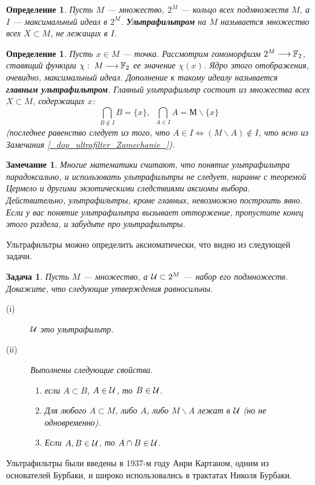 \documentclass[12pt]{book}
\newcommand{\arrow}{{\:\longrightarrow\:}}
\theoremstyle{upshape}
\newtheorem{zadacha}{Задача}[chapter]
\theoremstyle{generic}
\newtheorem{opredelenie}[teorema]{Определение}
\newtheorem{remark}[teorema]{Замечание}
\def\замечание{\begin{remark}}
\def\еза{\end{remark}}
\theoremstyle{upshapenonumber}
\renewcommand{\labelenumi}{\ralph{enumi}.}
\newcommand{\следствие}{%
     \refstepcounter{teorema}
     {\noindent\bf Следствие \thechapter.\arabic{teorema}:\ }}
\newcommand{\пример}{%
     \refstepcounter{teorema}
     {\noindent\bf Пример \thechapter.\arabic{teorema}:\ }}
\newcommand{\лемма}{%
     \refstepcounter{teorema}
     {\noindent\bf Лемма \thechapter.\arabic{teorema}:\ }}
\newcommand{\теорема}{%
     \refstepcounter{teorema}
     {\noindent\bf Теорема \thechapter.\arabic{teorema}:\ }}
\newcommand{\утверждение}{%
     \refstepcounter{teorema}
     {\noindent\bf Утверждение \thechapter.\arabic{teorema}:\ }}
\def\бф{\bf}
\def\ем{\em}
\def\задача{\begin{zadacha}}
\def\ез{\end{zadacha}}
\def\еу{\end{ukazanie}}
\def\определение{\begin{opredelenie}}
\def\ео{\end{opredelenie}}
\def\енум{\begin{enumerate}}
\def\ее{\end{enumerate}}
\begin{document}
\определение
Пусть $M$ --- множество, $2^M$ --- кольцо всех подмножеств $M$,
а $I$ --- максимальный идеал в $2^M$. {\бф Ультрафильтром} на $M$
называется множество всех $X\subset M$, не лежащих в $I$.
\ео





\определение
Пусть $x\in M$ --- точка. Рассмотрим гомоморфизм 
$2^M \arrow {\Bbb F}_2$, ставящий функции $\chi:\; M \arrow {\Bbb F}_2$
ее значение $\chi(x)$. Ядро этого отображения, очевидно,
максимальный идеал. Дополнение к такому идеалу называется
{\бф главным ультрафильтром}. 
Главный ультрафильтр состоит из множества всех
$X\subset M$, содержащих $x$:
\[
\bigcap_{B\notin I} B = \{x\}, \ \ \bigcap_{A\in I} A = М
\backslash \{x\}
\]
(последнее равенство следует из того, что 
$A \in I \Leftrightarrow (M \backslash A) \notin I$,
что ясно из Замечания \ref{_dop_ultrafilter_Zamechanie_}).
\ео

\замечание
Многие математики считают, что понятие ультрафильтра
парадоксально, и использовать ультрафильтры не следует,
наравне с теоремой Цермело и другими экзотическими
следствиями аксиомы выбора.
Действительно, ультрафильтры, кроме главных,
невозможно построить явно. Если у вас понятие 
ультрафильтра вызывает отторжение, пропустите
конец этого раздела, и забудьте про ультрафильтры.
\еза


Ультрафильтры можно определить аксиоматически,
что видно из следующей задачи.

\задача
Пусть $M$ --- множество, а ${\cal U} \subset 2^M$ --- набор
его подмножеств. Докажите, что следующие утверждения
равносильны.
\begin{description}
 \item[(i)] ${\cal U}$ это ультрафильтр.
\item[(ii)] Выполнены следующие свойства.
\begin{enumerate}
\renewcommand{\labelenumi}{{\bf \Alph{enumi}.}}
\item если $A\subset B$, $A\in {\cal U}$, то $B \in {\cal U}$.
\item Для любого $A \subset M$, либо $A$, либо
$M\backslash A$ лежат в ${\cal U}$ (но не одновременно).
\item Если $A, B \in {\cal U}$, то $A \cap B\in {\cal U}$.
\end{enumerate}
\end{description}
\ез

Ультрафильтры были введены в 1937-м году
Анри Картаном, одним из основателей Бурбаки,
и широко использовались в трактатах Николя Бурбаки.
\end{document}
